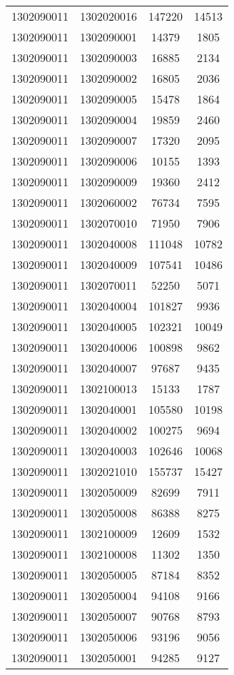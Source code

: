 \begin{longtable}{llcc}
1302090011 & 1302020016 & 147220 & 14513\\
1302090011 & 1302090001 & 14379 & 1805\\
1302090011 & 1302090003 & 16885 & 2134\\
1302090011 & 1302090002 & 16805 & 2036\\
1302090011 & 1302090005 & 15478 & 1864\\
1302090011 & 1302090004 & 19859 & 2460\\
1302090011 & 1302090007 & 17320 & 2095\\
1302090011 & 1302090006 & 10155 & 1393\\
1302090011 & 1302090009 & 19360 & 2412\\
1302090011 & 1302060002 & 76734 & 7595\\
1302090011 & 1302070010 & 71950 & 7906\\
1302090011 & 1302040008 & 111048 & 10782\\
1302090011 & 1302040009 & 107541 & 10486\\
1302090011 & 1302070011 & 52250 & 5071\\
1302090011 & 1302040004 & 101827 & 9936\\
1302090011 & 1302040005 & 102321 & 10049\\
1302090011 & 1302040006 & 100898 & 9862\\
1302090011 & 1302040007 & 97687 & 9435\\
1302090011 & 1302100013 & 15133 & 1787\\
1302090011 & 1302040001 & 105580 & 10198\\
1302090011 & 1302040002 & 100275 & 9694\\
1302090011 & 1302040003 & 102646 & 10068\\
1302090011 & 1302021010 & 155737 & 15427\\
1302090011 & 1302050009 & 82699 & 7911\\
1302090011 & 1302050008 & 86388 & 8275\\
1302090011 & 1302100009 & 12609 & 1532\\
1302090011 & 1302100008 & 11302 & 1350\\
1302090011 & 1302050005 & 87184 & 8352\\
1302090011 & 1302050004 & 94108 & 9166\\
1302090011 & 1302050007 & 90768 & 8793\\
1302090011 & 1302050006 & 93196 & 9056\\
1302090011 & 1302050001 & 94285 & 9127\\

\end{longtable}
